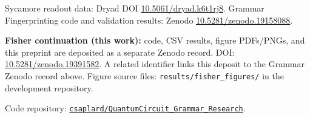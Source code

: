 \documentclass[11pt,a4paper]{article}
\begin{document}
Sycamore readout data: Dryad DOI \href{https://doi.org/10.5061/dryad.k6t1rj8}{10.5061/dryad.k6t1rj8}. Grammar Fingerprinting code and validation results: Zenodo \href{https://doi.org/10.5281/zenodo.19158088}{10.5281/zenodo.19158088}.

\textbf{Fisher continuation (this work):} code, CSV results, figure PDFs/PNGs, and this preprint are deposited as a separate Zenodo record. DOI: \href{https://doi.org/10.5281/zenodo.19391582}{10.5281/zenodo.19391582}. A related identifier links this deposit to the Grammar Zenodo record above. Figure source files: \texttt{results/fisher\_figures/} in the development repository.

Code repository: \href{https://github.com/csaplard/QuantumCircuit_Grammar_Research}{\texttt{csaplard/QuantumCircuit\_Grammar\_Research}}.
\end{document}
